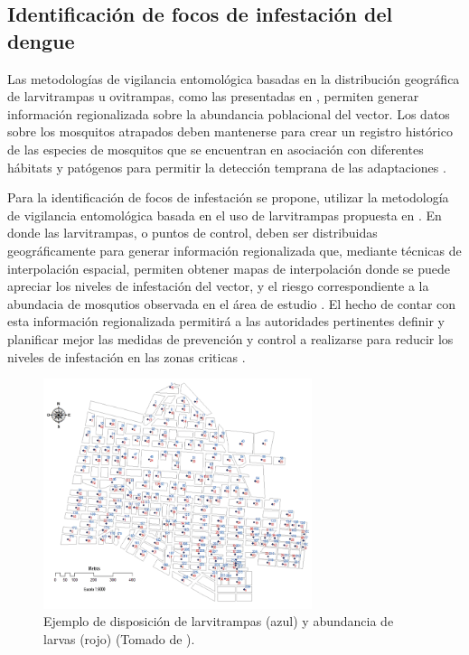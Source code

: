 \subsection{Identificación de focos de infestación del dengue}
\label{sec:cap4-identificacion-focos}
Las metodologías de vigilancia entomológica basadas en la distribución geográfica de larvitrampas
u ovitrampas, como las presentadas en
\cite{NINO2011,petric2012surveillance, journal.pone.0054167,nino2008uso}, permiten generar
información regionalizada sobre la abundancia poblacional del vector. Los datos
sobre los mosquitos atrapados deben mantenerse para crear un registro histórico de las especies de
mosquitos que se encuentran en asociación con diferentes hábitats y patógenos para permitir la
detección temprana de las adaptaciones \cite{petric2012surveillance}.

Para la identificación de focos de infestación se propone, utilizar la metodología de vigilancia
entomológica basada en el uso de larvitrampas propuesta en \cite{NINO2011}. En donde las
larvitrampas, o puntos de control, deben ser distribuidas geográficamente para generar información
regionalizada que, mediante técnicas de interpolación espacial, permiten obtener mapas de
interpolación donde se puede apreciar los niveles de infestación del vector, y el riesgo
correspondiente a la abundacia de mosqutios observada en el área de estudio \cite{NINO2011, nino2008uso, journal.pone.0054167, albierispatial}. El hecho de contar con esta información
regionalizada permitirá a las autoridades pertinentes definir y planificar mejor las medidas de
prevención y control a realizarse para reducir los niveles de infestación en las zonas criticas
\cite{NINO2011, nino2008uso, petric2012surveillance}.

\begin{figure}[!htbp]
\centering
\includegraphics[width=0.7\textwidth]{capitulo-2/graphics/distribucion-puntos-control.png}
\caption{\label{fig:sig-distribucion-puntos-control}Ejemplo de disposición de larvitrampas (azul) y abundancia de larvas (rojo) (Tomado de \cite{NINO2011}).}
\end{figure}

